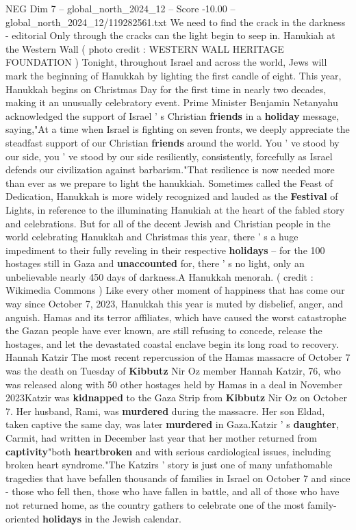 \begin{textsample}{NEG Dim 7 – global\_north\_2024\_12 – Score -10.00 – global\_north\_2024\_12/119282561.txt}  \label{ex:f7_neg_154}
We need to find the crack in the darkness - editorial Only through the cracks can the light begin to seep in.
Hanukiah at the Western Wall ( photo credit : WESTERN WALL HERITAGE FOUNDATION ) Tonight, throughout Israel and across the world, Jews will mark the beginning of Hanukkah by lighting the first candle of eight.
This year, Hanukkah begins on Christmas Day for the first time in nearly two decades, making it an unusually celebratory event.
Prime Minister Benjamin Netanyahu acknowledged the support of Israel ' s Christian \textbf{friends} in a \textbf{holiday} message, saying,"At a time when Israel is fighting on seven fronts, we deeply appreciate the steadfast support of our Christian \textbf{friends} around the world.
You ' ve stood by our side, you ' ve stood by our side resiliently, consistently, forcefully as Israel defends our civilization against barbarism."That resilience is now needed more than ever as we prepare to light the hanukkiah.
Sometimes called the Feast of Dedication, Hanukkah is more widely recognized and lauded as the \textbf{Festival} of Lights, in reference to the illuminating Hanukiah at the heart of the fabled story and celebrations.
But for all of the decent Jewish and Christian people in the world celebrating Hanukkah and Christmas this year, there ' s a huge impediment to their fully reveling in their respective \textbf{holidays} -- for the 100 hostages still in Gaza and \textbf{unaccounted} for, there ' s no light, only an unbelievable nearly 450 days of darkness.A Hanukkah menorah. ( credit : Wikimedia Commons ) Like every other moment of happiness that has come our way since October 7, 2023, Hanukkah this year is muted by disbelief, anger, and anguish.
Hamas and its terror affiliates, which have caused the worst catastrophe the Gazan people have ever known, are still refusing to concede, release the hostages, and let the devastated coastal enclave begin its long road to recovery.
Hannah Katzir The most recent repercussion of the Hamas massacre of October 7 was the death on Tuesday of \textbf{Kibbutz} Nir Oz member Hannah Katzir, 76, who was released along with 50 other hostages held by Hamas in a deal in November 2023Katzir was \textbf{kidnapped} to the Gaza Strip from \textbf{Kibbutz} Nir Oz on October 7.
Her husband, Rami, was \textbf{murdered} during the massacre.
Her son Eldad, taken captive the same day, was later \textbf{murdered} in Gaza.Katzir ' s \textbf{daughter}, Carmit, had written in December last year that her mother returned from \textbf{captivity}"both \textbf{heartbroken} and with serious cardiological issues, including broken heart syndrome."The Katzirs ' story is just one of many unfathomable tragedies that have befallen thousands of families in Israel on October 7 and since - those who fell then, those who have fallen in battle, and all of those who have not returned home, as the country gathers to celebrate one of the most family-oriented \textbf{holidays} in the Jewish calendar.

\end{textsample}
